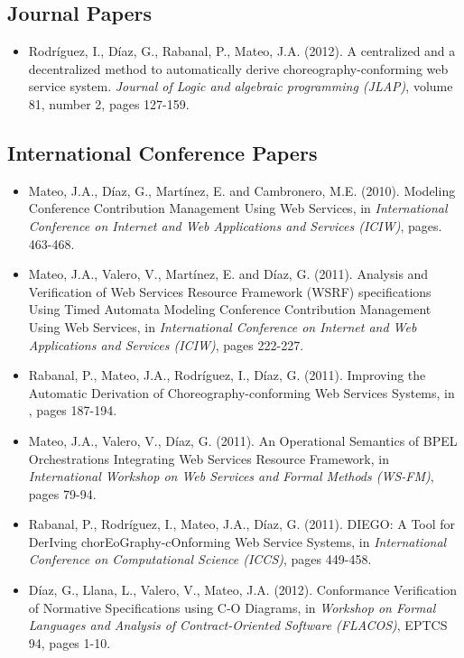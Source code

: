 \subsection{Journal Papers}
%
\begin{itemize}
%
\item 
Rodr\'iguez, I., D\'iaz, G., Rabanal, P., Mateo, J.A. (2012). A centralized and a decentralized method to automatically derive choreography-conforming web service system. \emph{Journal of Logic and algebraic programming (JLAP)}, volume 81, number 2, pages 127-159.

\end{itemize}
%
\subsection{International Conference Papers}
%
\begin{itemize}
%
\item 
Mateo, J.A., D\'iaz, G., Mart\'inez, E. and Cambronero, M.E. (2010). Modeling Conference Contribution Management Using Web Services, in \emph{International Conference on Internet and Web Applications and Services (ICIW)}, pages. 463-468.
%
\item
Mateo, J.A., Valero, V., Mart\'inez, E. and D\'iaz, G. (2011). Analysis and Verification of Web Services Resource Framework (WSRF) specifications Using Timed Automata Modeling Conference Contribution Management Using Web Services, in \emph{International Conference on Internet and Web Applications and Services (ICIW)}, pages 222-227.
%
\item
Rabanal, P., Mateo, J.A., Rodr\'iguez, I., D\'iaz, G. (2011). Improving the Automatic Derivation of Choreography-conforming Web Services Systems, in    
\emph{}, pages 187-194.  
%
\item 
Mateo, J.A., Valero, V., D\'iaz, G. (2011). An Operational Semantics of BPEL Orchestrations Integrating Web Services Resource Framework, in \emph{International Workshop on Web Services and Formal Methods (WS-FM)},  pages 79-94.
%
\item
Rabanal, P.,  Rodr\'iguez, I., Mateo, J.A., D\'iaz, G. (2011). DIEGO: A Tool for DerIving chorEoGraphy-cOnforming Web Service Systems, in    
\emph{International Conference on Computational Science (ICCS)}, pages 449-458.
%
\item
D\'iaz, G., Llana, L., Valero, V., Mateo, J.A. (2012). Conformance Verification of Normative Specifications using C-O Diagrams, in 
\emph{Workshop on Formal Languages and Analysis of Contract-Oriented Software (FLACOS)}, EPTCS 94, pages 1-10.

\end{itemize}
